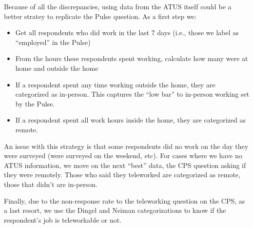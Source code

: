 \documentclass[
]{article}
\providecommand{\tightlist}{%
  \setlength{\itemsep}{0pt}\setlength{\parskip}{0pt}}
\begin{document}
Because of all the discrepancies, using data from the ATUS itself could
be a better stratey to replicate the Pulse question. As a first step we:

\begin{itemize}
\tightlist
\item
  Get all respondents who did work in the last 7 days (i.e., those we
  label as ``employed'' in the Pulse)
\item
  From the hours these respondents spent working, calculate how many
  were at home and outside the home
\item
  If a respondent spent any time working outside the home, they are
  categorized as in-person. This captures the ``low bar'' to in-person
  working set by the Pulse.
\item
  If a respondent spent all work hours inside the home, they are
  categorized as remote.
\end{itemize}

An issue with this strategy is that some respondents did no work on the
day they were surveyed (were surveyed on the weekend, etc). For cases
where we have no ATUS information, we move on the next ``best'' data,
the CPS question asking if they were remotely. Those who said they
teleworked are categorized as remote, those that didn't are in-person.

Finally, due to the non-response rate to the teleworking question on the
CPS, as a last resort, we use the Dingel and Neiman categorizations to
know if the respondent's job is teleworkable or not.
\end{document}
